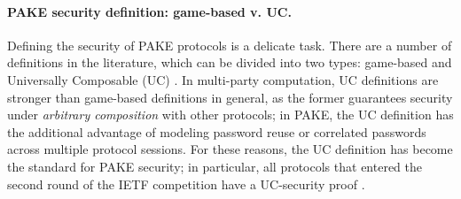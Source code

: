 \paragraph{PAKE security definition: game-based v. UC.}
Defining the security of PAKE protocols is a delicate task. There are a number of definitions in the literature, which can be divided into two types: game-based \cite{EC:BelPoiRog00,PKC:AbdFouPoi05} and Universally Composable (UC) \cite{EC:CHKLM05,C:ABBJKX20}. In multi-party computation, UC definitions are stronger than game-based definitions in general, as the former guarantees security under \emph{arbitrary composition} with other protocols; in PAKE, the UC definition has the additional advantage of modeling password reuse or correlated passwords across multiple protocol sessions. For these reasons, the UC definition has become the standard for PAKE security; in particular, all protocols that entered the second round of the IETF competition have a UC-security proof \cite{AC:AbdHaaHes21,C:ABBJKX20,EC:JarKraXu18,aucpace}.

